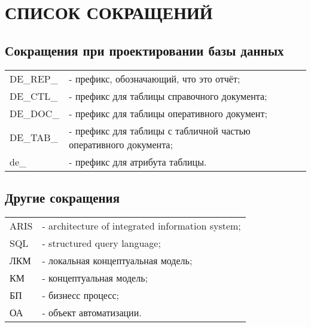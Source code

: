 {}
\section*{СПИСОК СОКРАЩЕНИЙ}

{}
\subsection*{Сокращения при проектировании базы данных}

\begin{tabular}{p{2cm}l}
    DE\_REP\_   & - префикс, обозначающий, что это отчёт; \\
    DE\_CTL\_   & - префикс для таблицы справочного документа; \\
    DE\_DOC\_   & - префикс для таблицы оперативного документ; \\
    DE\_TAB\_   & - префикс для таблицы с табличной частью оперативного документа; \\
    de\_        & - префикс для атрибута таблицы. \\
\end{tabular}

{}
\subsection*{Другие сокращения}

\begin{tabular}{p{2cm}l}
    ARIS    & - architecture of integrated information system;\\
    SQL     & - structured query language;\\
    ЛКМ     & - локальная концептуальная модель;\\ 
    КМ      & - концептуальная модель;\\
    БП      & - бизнесс процесс;\\
    ОА      & - объект автоматизации.\\
\end{tabular}

\newpage
